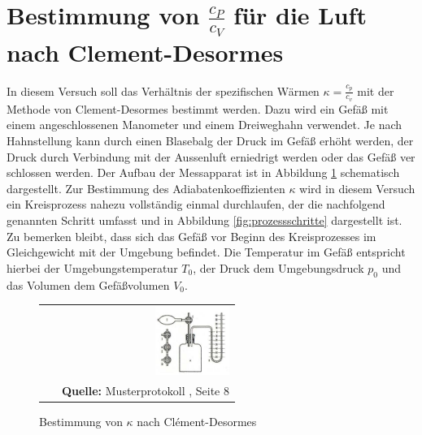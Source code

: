 \documentclass[a4paper,titlepage]{scrartcl}
\numberwithin{equation}{section}
\begin{document}
\section{Bestimmung von $\frac{c_P}{c_V}$ für die Luft nach Clement-Desormes}
In diesem Versuch soll das Verhältnis der spezifischen Wärmen $\kappa = \frac{c_p}{c_v}$ mit der Methode von Clement-Desormes bestimmt werden. Dazu wird ein Gefäß mit einem angeschlossenen Manometer und einem Dreiweghahn verwendet. Je nach Hahnstellung kann durch einen Blasebalg der Druck im Gefäß erhöht werden, der Druck durch Verbindung mit der Aussenluft erniedrigt werden oder das Gefäß ver schlossen werden. Der Aufbau der Messapparat ist in Abbildung \ref{fig:clementDesormes} schematisch dargestellt.
Zur Bestimmung des Adiabatenkoeffizienten $\kappa$ wird in diesem Versuch ein Kreisprozess nahezu vollständig einmal durchlaufen, der die nachfolgend genannten Schritt umfasst und in Abbildung
\ref{fig:prozessschritte} dargestellt ist.\\
Zu bemerken bleibt, dass sich das Gefäß vor Beginn des Kreisprozesses im Gleichgewicht mit der Umgebung befindet. Die Temperatur im Gefäß entspricht hierbei der Umgebungstemperatur $T_0$, der Druck dem Umgebungsdruck $p_0$ und das Volumen dem Gefäßvolumen $V_0$.
\begin{figure}[H]
	\centering
	\begin{tabular}{@{}r@{}}
		\includegraphics[width=0.4\textwidth]{bilder/clement-desormes.JPG}\\
		\footnotesize\sffamily\textbf{Quelle:} Musterprotokoll \cite{vorbereitung1}, Seite 8
	\end{tabular}
	\caption{Bestimmung von $\kappa$ nach Clément-Desormes}
	\label{fig:clementDesormes}
\end{figure}
\end{document}
